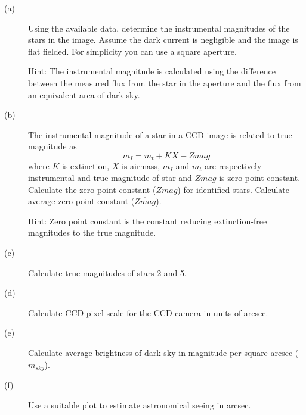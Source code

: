 \begin{description}
\item[(a)] Using the available data, determine the instrumental magnitudes
  of the stars in the image. Assume the dark current is negligible and the
  image is flat fielded. For simplicity you can use a square aperture.

  Hint: The instrumental magnitude is calculated using the difference
  between the measured flux from the star in the aperture and the flux from
  an equivalent area of dark sky.
\item[(b)] The instrumental magnitude of a star in a CCD image is related to
  true magnitude as
  \[ m_I = m_t + KX - Zmag \]
  where $K$ is extinction, $X$ is airmass, $m_I$ and $m_t$ are respectively
  instrumental and true magnitude of star and $Zmag$ is zero point constant.
  Calculate the zero point constant ($Zmag$) for identified stars. Calculate
  average zero point constant ($\overline{Zmag}$).

  Hint: Zero point constant is the constant reducing extinction-free
  magnitudes to the true magnitude.
\item[(c)] Calculate true magnitudes of stars 2 and 5.
\item[(d)] Calculate CCD pixel scale for the CCD camera in units of arcsec.
\item[(e)] Calculate average brightness of dark sky in magnitude per square
  arcsec ($m_{sky}$).
\item[(f)] Use a suitable plot to estimate astronomical seeing in arcsec.
\end{description}
